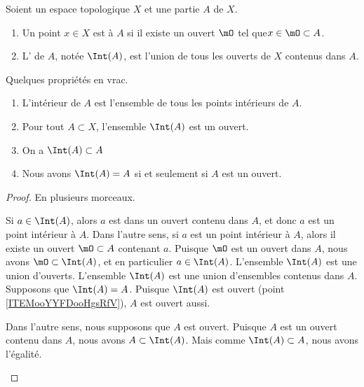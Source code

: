 \begin{definition}      \label{DEFooSVWMooLpAVZRInt}
	Soient un espace topologique \( X\) et une partie \( A\) de \( X\).
	\begin{enumerate}
		\item
		      Un point \( x\in X\) est  à \( A\) si il existe un ouvert \( \mO\) tel que\( x\in \mO\subset A\).
		\item
		      L' de \( A\), notée \( \Int(A)\), est l'union de tous les ouverts de \( X\) contenus dans \( A\).
	\end{enumerate}
\end{definition}

\begin{lemma}
	Quelques propriétés en vrac.
	\begin{enumerate}
		\item   \label{ITEMooHLIMooJEacKt}
		      L'intérieur de \( A\) est l'ensemble de tous les points intérieurs de \( A\).
		\item \label{ITEMooYTXSooMyiBpMgzK}
		      Pour tout \( A \subset X\), l'ensemble \( \Int(A)\) est un ouvert.
		\item   \label{ITEMooYYFDooHgsRfV}
		      On a  \( \Int(A) \subset A \)
		\item \label{ITEMooTDXFooFdyLeO}
		      Nous avons \( \Int(A) = A \) si et seulement si \( A\) est un ouvert.
	\end{enumerate}
\end{lemma}

\begin{proof}
	En plusieurs morceaux.
	\begin{subproof}
		\spitem[\ref{ITEMooHLIMooJEacKt}]
		Si \( a\in\Int(A)\), alors \( a\) est dans un ouvert contenu dans \( A\), et donc \( a\) est un point intérieur à \( A\). Dans l'autre sens, si \( a\) est un point intérieur à \( A\), alors il existe un ouvert \( \mO\subset A\) contenant \( a\). Puisque \( \mO\) est un ouvert dans \( A\), nous avons \( \mO\subset\Int(A)\), et en particulier \( a\in \Int(A)\).
		\spitem[\ref{ITEMooYTXSooMyiBpMgzK}]
		L'ensemble \( \Int(A)\) est une union d'ouverts.
		\spitem[\ref{ITEMooYYFDooHgsRfV}]
		L'ensemble \( \Int(A)\) est une union d'ensembles contenus dans \( A\).
		\spitem[\ref{ITEMooTDXFooFdyLeO}]
		Supposons que \( \Int(A)=A\). Puisque \( \Int(A)\) est ouvert (point \ref{ITEMooYYFDooHgsRfV}), \( A\) est ouvert aussi.

		Dans l'autre sens, nous supposons que \( A\) est ouvert. Puisque \( A\) est un ouvert contenu dans \( A\), nous avons \( A\subset\Int(A)\). Mais comme \( \Int(A)\subset A\), nous avons l'égalité.
	\end{subproof}
\end{proof}

